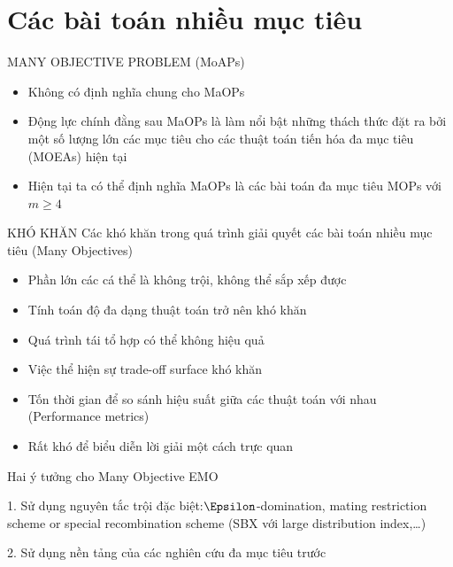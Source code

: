 \documentclass{beamer}
\begin{document}
    \section{Các bài toán nhiều mục tiêu}
    \begin{frame}{MANY OBJECTIVE PROBLEM (MoAPs)}
        \begin{itemize}
            \item <1-> Không có định nghĩa chung cho MaOPs
            \item <2-> Động lực chính đằng sau MaOPs là làm nổi bật những thách thức đặt ra bởi một số lượng lớn các mục tiêu cho các thuật toán tiến hóa đa mục tiêu (MOEAs) hiện tại
            \item <3-> Hiện tại ta có thể định nghĩa MaOPs là các bài toán đa mục tiêu MOPs với $m \geq 4$
        \end{itemize}
    \end{frame}

    \begin{frame}{KHÓ KHĂN}
    {Các khó khăn trong quá trình giải quyết các bài toán nhiều mục tiêu (Many Objectives)}
        \begin{itemize}
            \item <1-> Phần lớn các cá thể là không trội, không thể sắp xếp được
            \item <2-> Tính toán độ đa dạng thuật toán trở nên khó khăn
            \item <3-> Quá trình tái tổ hợp có thể không hiệu quả
            \item <4-> Việc thể hiện sự trade-off surface khó khăn
            \item <5-> Tốn thời gian để so sánh hiệu suất giữa các thuật toán với nhau (Performance metrics)
            \item <6-> Rất khó để biểu diễn lời giải một cách trực quan
        \end{itemize}
    \end{frame}
    \begin{frame}{Hai ý tưởng cho Many Objective EMO}
        \begin{block}{1.}
            Sử dụng nguyên tắc trội đặc biệt:$\Epsilon$-domination, mating restriction scheme or special recombination scheme (SBX với large distribution index,…)
        \end{block}
        \pause
        \begin{block}{2.}
            Sử dụng nền tảng của các nghiên cứu đa mục tiêu trước
        \end{block}
    \end{frame}
\end{document}
